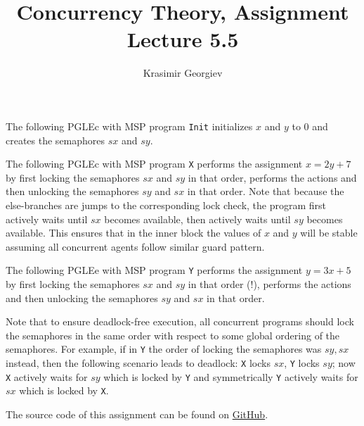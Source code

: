 \documentclass[a4paper]{article}
\title{Concurrency Theory, Assignment Lecture 5.5}
\author{Krasimir Georgiev}
\newcommand{\prog}[1]{\texttt{#1}}
\begin{document}
\maketitle

The following PGLEc with MSP program \prog{Init} initializes $x$ and $y$ to 0
and creates the semaphores $sx$ and $sy$.


The following PGLEc with MSP program \prog{X} performs the assignment
$x = 2y + 7$ by first locking the semaphores $sx$ and $sy$ in that order,
performs the actions and then unlocking the semaphores $sy$ and $sx$ in that
order. Note that because the else-branches are jumps to the corresponding lock
check, the program first actively waits until $sx$ becomes available, then
actively waits until $sy$ becomes available. This ensures that in the inner
block the values of $x$ and $y$ will be stable assuming all concurrent agents
follow similar guard pattern.


The following PGLEe with MSP program \prog{Y} performs the assignment $y = 3x +
5$ by first locking the semaphores $sx$ and $sy$ in that order (!), performs
the actions and then unlocking the semaphores $sy$ and $sx$ in that order.


Note that to ensure deadlock-free execution, all concurrent programs should
lock the semaphores in the same order with respect to some global ordering of
the semaphores. For example, if in \prog{Y} the order of locking the semaphores
was $sy, sx$ instead, then the following scenario leads to deadlock: \prog{X}
locks $sx$, \prog{Y} locks $sy$; now \prog{X} actively waits for $sy$ which is
locked by \prog{Y} and symmetrically \prog{Y} actively waits for $sx$ which is
locked by \prog{X}.

The source code of this assignment can be found on
\href{https://github.com/comco/concurrency-theory-assignments/tree/master/assignment-lecture-5.5}{GitHub}.
\end{document}
